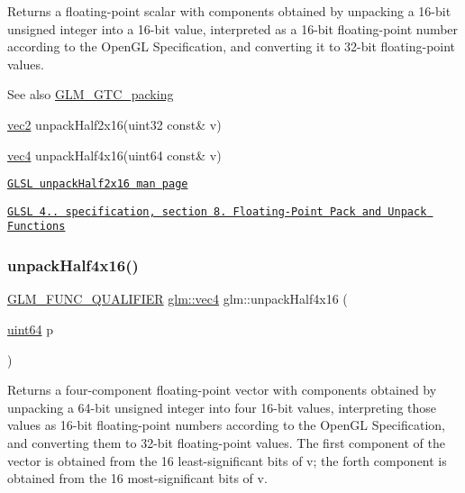 Returns a floating-\/point scalar with components obtained by unpacking a 16-\/bit unsigned integer into a 16-\/bit value, interpreted as a 16-\/bit floating-\/point number according to the Open\+GL Specification, and converting it to 32-\/bit floating-\/point values.

\begin{DoxySeeAlso}{See also}
\hyperlink{group__gtc__packing}{G\+L\+M\+\_\+\+G\+T\+C\+\_\+packing} 

\hyperlink{group__core__types_gaa1618f51db67eaa145db101d8c8431d8}{vec2} unpack\+Half2x16(uint32 const\& v) 

\hyperlink{group__core__types_ga5881b1b022d7fd1b7218f5916532dd02}{vec4} unpack\+Half4x16(uint64 const\& v) 

\href{http://www.opengl.org/sdk/docs/manglsl/xhtml/unpackHalf2x16.xml}{\tt G\+L\+SL unpack\+Half2x16 man page} 

\href{http://www.opengl.org/registry/doc/GLSLangSpec.4.20.8.pdf}{\tt G\+L\+SL 4.. specification, section 8. Floating-\/\+Point Pack and Unpack Functions} 
\end{DoxySeeAlso}
\mbox{\label{group__gtc__packing_gaea526d6491ad40401eac34803984bf27}} 
\subsubsection{\texorpdfstring{unpack\+Half4x16()}{unpackHalf4x16()}}
{\footnotesize\ttfamily \hyperlink{setup_8hpp_a33fdea6f91c5f834105f7415e2a64407}{G\+L\+M\+\_\+\+F\+U\+N\+C\+\_\+\+Q\+U\+A\+L\+I\+F\+I\+ER} \hyperlink{group__core__types_ga5881b1b022d7fd1b7218f5916532dd02}{glm\+::vec4} glm\+::unpack\+Half4x16 (\begin{DoxyParamCaption}\item[{\hyperlink{group__gtc__type__precision_gae3632bf9b37da66233d78930dd06378a}{uint64}}]{p }\end{DoxyParamCaption})}

Returns a four-\/component floating-\/point vector with components obtained by unpacking a 64-\/bit unsigned integer into four 16-\/bit values, interpreting those values as 16-\/bit floating-\/point numbers according to the Open\+GL Specification, and converting them to 32-\/bit floating-\/point values. The first component of the vector is obtained from the 16 least-\/significant bits of v; the forth component is obtained from the 16 most-\/significant bits of v.


